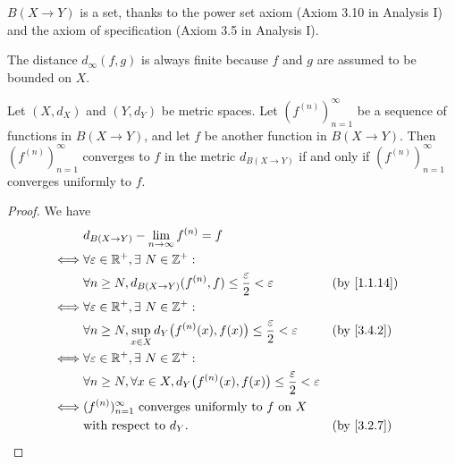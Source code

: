 \begin{note}
  \(B(X \to Y)\) is a set, thanks to the power set axiom (Axiom 3.10 in Analysis I) and the axiom of specification (Axiom 3.5 in Analysis I).
\end{note}

\begin{note}
  The distance \(d_\infty(f, g)\) is always finite because \(f\) and \(g\) are assumed to be bounded on \(X\).
\end{note}

\setcounter{thm}{3}
\begin{prop}\label{3.4.4}
  Let \((X, d_X)\) and \((Y, d_Y)\) be metric spaces.
  Let \((f^{(n)})_{n = 1}^\infty\) be a sequence of functions in \(B(X \to Y)\), and let \(f\) be another function in \(B(X \to Y)\).
  Then \((f^{(n)})_{n = 1}^\infty\) converges to \(f\) in the metric \(d_{B(X \to Y)}\) if and only if \((f^{(n)})_{n = 1}^\infty\) converges uniformly to \(f\).
\end{prop}

\begin{proof}
  We have
  \begin{align*}
         & d_{B(X \to Y)} - \lim_{n \to \infty} f^{(n)} = f                                                                                          \\
    \iff & \forall \varepsilon \in \R^+, \exists\ N \in \Z^+ :                                                                                       \\
         & \forall n \geq N, d_{B(X \to Y)}(f^{(n)}, f) \leq \dfrac{\varepsilon}{2} < \varepsilon                     &  & \text{(by \cref{1.1.14})} \\
    \iff & \forall \varepsilon \in \R^+, \exists\ N \in \Z^+ :                                                                                       \\
         & \forall n \geq N, \sup_{x \in X} d_Y\big(f^{(n)}(x), f(x)\big) \leq \dfrac{\varepsilon}{2} < \varepsilon   &  & \by{3.4.2}                \\
    \iff & \forall \varepsilon \in \R^+, \exists\ N \in \Z^+ :                                                                                       \\
         & \forall n \geq N, \forall x \in X, d_Y\big(f^{(n)}(x), f(x)\big) \leq \dfrac{\varepsilon}{2} < \varepsilon                                \\
    \iff & (f^{(n)})_{n = 1}^\infty \text{ converges uniformly to } f \text{ on } X                                                                  \\
         & \text{with respect to } d_Y.                                                                               &  & \by{3.2.7}
  \end{align*}
\end{proof}

